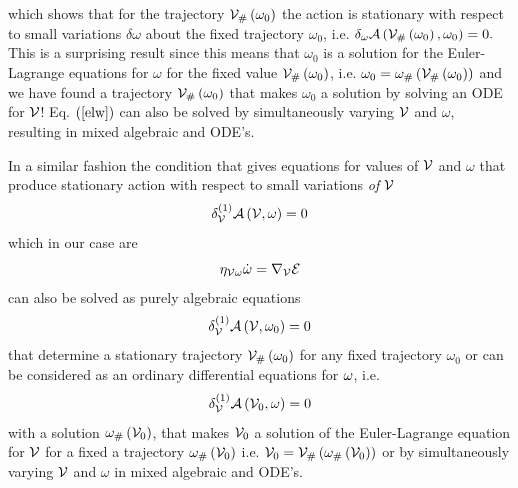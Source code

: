 which shows that for the trajectory ${\cal V}_{\#}\left( \omega _{0}\right) $
the action is stationary with respect to small variations $\delta \omega $
about the fixed trajectory $\omega _{0}$, i.e. $\delta _{\omega }{\cal A}%
\left( {\cal V}_{\#}\left( \omega _{0}\right) ,\omega _{0}\right) =0.$ This
is a surprising result since this means that $\omega _{0}$ is a solution for
the Euler-Lagrange equations for $\omega $ for the fixed value ${\cal V}%
_{\#}\left( \omega _{0}\right) $, i.e. $\omega _{0}=\omega _{\#}\left( {\cal %
V}_{\#}\left( \omega _{0}\right) \right) $ and we have found a trajectory $%
{\cal V}_{\#}\left( \omega _{0}\right) $ that makes $\omega _{0}$ a solution
by solving an ODE for ${\cal V}$! Eq. $\left( \ref{elw}\right) $ can also be
solved by simultaneously varying ${\cal V}$ and $\omega $, resulting in
mixed algebraic and ODE's.

In a similar fashion the condition that gives equations for values of ${\cal %
V}$ and $\omega $ that produce stationary action with respect to small
variations {\em of } ${\cal V}$%
\begin{equation}
\delta _{{\cal V}}^{\left( 1\right) }{\cal A}\left( {\cal V},\omega \right)
=0
\end{equation}%
which in our case are 
\begin{equation}
\eta _{{\cal V\omega }}{\cal \dot{\omega}}=\nabla _{{\cal V}}{\cal E}
\end{equation}%
can also be solved as purely algebraic equations 
\begin{equation}
\delta _{{\cal V}}^{\left( 1\right) }{\cal A}\left( {\cal V},\omega
_{0}\right) =0
\end{equation}%
that determine a stationary trajectory ${\cal V}_{\#}\left( \omega
_{0}\right) $ for any fixed trajectory $\omega _{0}$ or can be considered as
an ordinary differential equations for ${\cal \omega }$, i.e. 
\begin{equation}
\delta _{{\cal V}}^{\left( 1\right) }{\cal A}\left( {\cal V}_{0},\omega
\right) =0
\end{equation}%
with a solution $\omega _{\#}\left( {\cal V}_{0}\right) $, that makes ${\cal %
V}_{0}$ a solution of the Euler-Lagrange equation for ${\cal V}$ for a fixed
a trajectory $\omega _{\#}\left( {\cal V}_{0}\right) $ i.e. ${\cal V}_{0}=%
{\cal V}_{\#}\left( \omega _{\#}\left( {\cal V}_{0}\right) \right) $ or by
simultaneously varying ${\cal V}$ and $\omega $ in mixed algebraic and ODE's.

